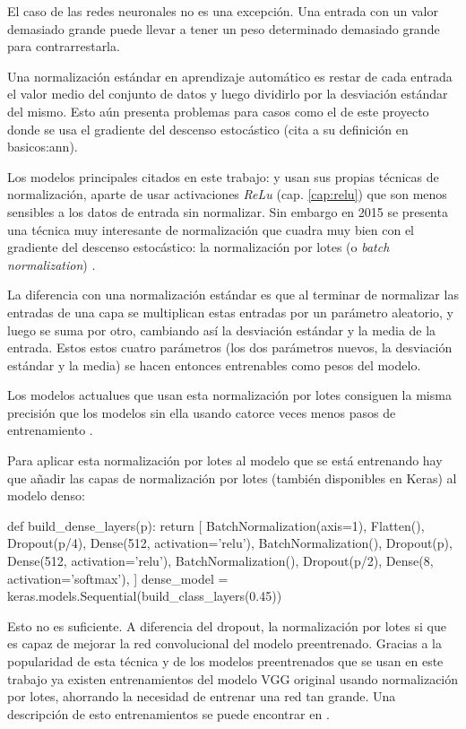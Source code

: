 El caso de las redes neuronales no es una excepción. Una entrada con un valor demasiado grande puede llevar a tener un peso determinado demasiado grande para contrarrestarla.

Una normalización estándar en aprendizaje automático es restar de cada entrada el valor medio del conjunto de datos y luego dividirlo por la desviación estándar del mismo. Esto aún presenta problemas para casos como el de este proyecto donde se usa el gradiente del descenso estocástico (cita a su definición en basicos:ann).

Los modelos principales citados en este trabajo: \cite{krizhevsky2012imagenet} y \cite{simonyan} usan sus propias técnicas de normalización, aparte de usar activaciones \textit{ReLu} (cap. \ref{cap:relu}) que son menos sensibles a los datos de entrada sin normalizar. Sin embargo en 2015 se presenta una técnica muy interesante de normalización que cuadra muy bien con el gradiente del descenso estocástico: la normalización por lotes (o \textit{batch normalization}) \parencite{batch_normalization}.

La diferencia con una normalización estándar es que al terminar de normalizar las entradas de una capa se multiplican estas entradas por un parámetro aleatorio, y luego se suma por otro, cambiando así la desviación estándar y la media de la entrada. Estos estos cuatro parámetros (los dos parámetros nuevos, la desviación estándar y la media) se hacen entonces entrenables como pesos del modelo.

Los modelos actualues que usan esta normalización por lotes consiguen la misma precisión que los modelos sin ella usando catorce veces menos pasos de entrenamiento \parencite{batch_normalization}.

Para aplicar esta normalización por lotes al modelo que se está entrenando hay que añadir las capas de normalización por lotes (también disponibles en Keras) al modelo denso:

\begin{python}
def build_dense_layers(p):
    return [
        BatchNormalization(axis=1),
        Flatten(),
        Dropout(p/4),
        Dense(512, activation='relu'),
        BatchNormalization(),
        Dropout(p),
        Dense(512, activation='relu'),
        BatchNormalization(),
        Dropout(p/2),
        Dense(8, activation='softmax'),
    ]
dense_model = keras.models.Sequential(build_class_layers(0.45))
\end{python}

Esto no es suficiente. A diferencia del dropout, la normalización por lotes si que es capaz de mejorar la red convolucional del modelo preentrenado. Gracias a la popularidad de esta técnica y de los modelos preentrenados que se usan en este trabajo ya existen entrenamientos del modelo VGG original usando normalización por lotes, ahorrando la necesidad de entrenar una red tan grande. Una descripción de esto entrenamientos se puede encontrar en \cite{pretrained_with_bn}.


